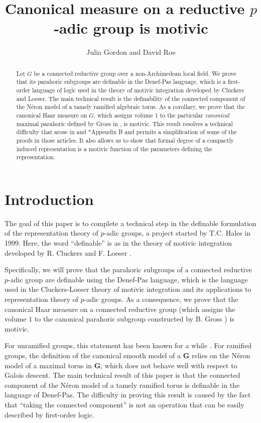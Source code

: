\documentclass{amsart}
\title[]{Canonical measure on a reductive $p$-adic group is motivic}
\author{Julia Gordon and David Roe}
\newcommand{\bG}{\mathbf{G}}
\theoremstyle{plain}
\theoremstyle{definition}
\begin{document}
\begin{abstract}  Let $G$ be a connected reductive group over a non-Archimedean local field. 
We prove that its parahoric subgroups are definable in the Denef-Pas language, which is a
first-order language of logic used in the theory of motivic integration developed by Cluckers and Loeser.
The main technical result is the definability of the connected component of the N\'eron model
of a tamely ramified algebraic torus.  As a corollary, we prove that the canonical Haar measure on $G$,
which assigns volume $1$ to the particular \emph{canonical} maximal parahoric defined by
Gross in \cite{gross:motive}, is motivic. This result resolves a technical difficulty that arose in
\cite{CGH-2} and \cite{S-T}*{Appendix B} and permits a simplification of some of the proofs in those articles. 
It also allows us to show that formal degree of a compactly induced representation is a
motivic function of the parameters defining the representation. 
\end{abstract}
\maketitle

\section{Introduction}
The goal of this paper is to complete a technical step in the 
definable formulation of 
the representation theory of $p$-adic groups, a project started by T.C. Hales in 1999. 
Here, the word ``definable'' is as in the theory of motivic integration developed by R. Cluckers and F. Loeser \cite{cluckers-loeser}.

Specifically, we will prove that the parahoric subgroups of a connected reductive $p$-adic group
are definable using the Denef-Pas language, which is the language used in the Cluckers-Loeser
theory of motivic integration and its applications to representation theory of $p$-adic groups.
As a consequence, we prove that the canonical Haar measure on a connected reductive group 
(which assigns the volume $1$ to the canonical parahoric subgroup constructed by B. Gross \cite{gross:motive}) is motivic.

For unramified groups, this statement has been known for a while \cite{cluckers-hales-loeser}.
For ramified groups, the definition of the canonical smooth model of a $\bG$ relies on the
N\'eron model of a maximal torus in $\bG$, which does not behave well with respect to Galois descent.
The main technical result of this paper is that the connected component of the N\'eron model
of a tamely ramified torus is definable in the language of Denef-Pas. The difficulty in proving this result
is caused by the fact that ``taking the connected component'' is not an operation that can be easily
described by first-order logic. 
\end{document}
